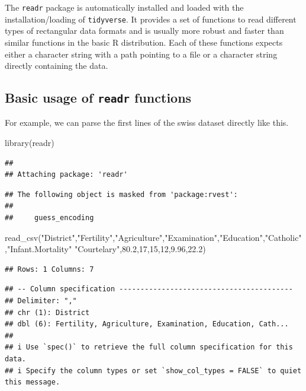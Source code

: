 \documentclass[
  12pt,
]{style/krantz}
\newenvironment{Shaded}{\begin{snugshade}}{\end{snugshade}}
\newcommand{\FunctionTok}[1]{\textcolor[rgb]{0.00,0.00,0.00}{#1}}
\newcommand{\NormalTok}[1]{#1}
\newcommand{\StringTok}[1]{\textcolor[rgb]{0.31,0.60,0.02}{#1}}
\begin{document}
The \texttt{readr} package is automatically installed and loaded with the installation/loading of \texttt{tidyverse}. It provides a set of functions to read different types of rectangular data formats and is usually more robust and faster than similar functions in the basic R distribution. Each of these functions expects either a character string with a path pointing to a file or a character string directly containing the data.

\hypertarget{basic-usage-of-readr-functions}{%
\subsection{\texorpdfstring{Basic usage of \texttt{readr} functions}{Basic usage of readr functions}}\label{basic-usage-of-readr-functions}}

For example, we can parse the first lines of the swiss dataset directly like this.

\begin{Shaded}
\begin{Highlighting}[]
\FunctionTok{library}\NormalTok{(readr)}
\end{Highlighting}
\end{Shaded}

\begin{verbatim}
## 
## Attaching package: 'readr'
\end{verbatim}

\begin{verbatim}
## The following object is masked from 'package:rvest':
## 
##     guess_encoding
\end{verbatim}

\begin{Shaded}
\begin{Highlighting}[]
\FunctionTok{read\_csv}\NormalTok{(}\StringTok{\textquotesingle{}"District","Fertility","Agriculture","Examination","Education","Catholic","Infant.Mortality"}
\StringTok{"Courtelary",80.2,17,15,12,9.96,22.2\textquotesingle{}}\NormalTok{)}
\end{Highlighting}
\end{Shaded}

\begin{verbatim}
## Rows: 1 Columns: 7
\end{verbatim}

\begin{verbatim}
## -- Column specification -----------------------------------------
## Delimiter: ","
## chr (1): District
## dbl (6): Fertility, Agriculture, Examination, Education, Cath...
## 
## i Use `spec()` to retrieve the full column specification for this data.
## i Specify the column types or set `show_col_types = FALSE` to quiet this message.
\end{verbatim}
\end{document}
